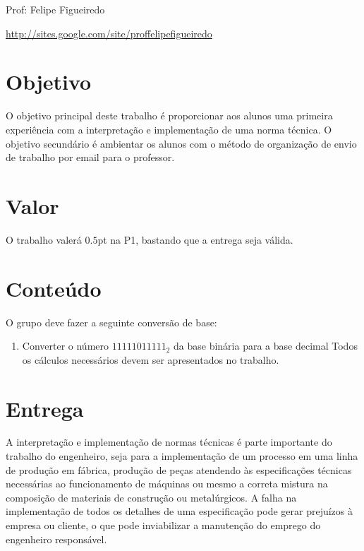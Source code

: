 \documentclass[a4paper]{article}
\begin{document}
\parbox[c]{.825\textwidth}{\raggedright%
{Prof: Felipe Figueiredo\par}
{\url{http://sites.google.com/site/proffelipefigueiredo}}

\vspace{1cm}
}


\section{Objetivo}
O objetivo principal deste trabalho é proporcionar aos alunos uma
primeira experiência com a interpretação e implementação de uma norma
técnica. O objetivo secundário é ambientar os alunos com o método de
organização de envio de trabalho por email para o professor.

\section{Valor}
O trabalho valerá $0.5$pt na P1, bastando que a entrega seja válida.

\section{Conteúdo}
O grupo deve fazer a seguinte conversão de base:
 
\begin{enumerate}
\item Converter o número $11111011111_2$ da base binária para a base
  decimal Todos os cálculos necessários devem ser apresentados no
  trabalho.
\end{enumerate}

\section{Entrega}
A interpretação e implementação de normas técnicas é parte importante
do trabalho do engenheiro, seja para a implementação de um processo em
uma linha de produção em fábrica, produção de peças atendendo às
especificações técnicas necessárias ao funcionamento de máquinas ou
mesmo a correta mistura na composição de materiais de construção ou
metalúrgicos. A falha na implementação de todos os detalhes de uma
especificação pode gerar prejuízos à empresa ou cliente, o que pode
inviabilizar a manutenção do emprego do engenheiro responsável.
\end{document}
